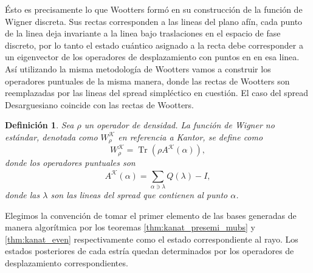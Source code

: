 \documentclass[a4paper]{report}
\DeclareMathOperator{\Tr}{Tr}
\newtheorem{definition}{Definición}
\begin{document}
  Ésto es precisamente lo que Wootters formó en su
  construcción de la función de Wigner discreta. Sus rectas
  corresponden a las lineas del plano afín, cada punto de la
  linea deja invariante a la linea bajo traslaciones en el
  espacio de fase discreto, por lo tanto el estado cuántico
  asignado a la recta debe corresponder a un eigenvector de
  los operadores de desplazamiento con puntos en en esa
  linea. Así utilizando la misma metodología de
  Wootters vamos a construir los operadores puntuales de la
  misma manera, donde las rectas de Wootters son
  reemplazadas por las lineas del spread simpléctico en
  cuestión. El caso del spread Desarguesiano coincide con
  las rectas de Wootters.
  \begin{definition}
    Sea $\rho$ un operador de densidad. La función de Wigner
    no estándar, denotada como $W_\rho^{\mathcal K}$ en
    referencia a Kantor, se define como
    \begin{equation}
      W_\rho^{\mathcal K}
      = \Tr\left( \rho A^{\mathcal K}(\alpha) \right),
    \end{equation}
    donde los operadores puntuales son
    \begin{equation}
      A^{\mathcal K}(\alpha)
      = \sum_{\alpha \ni \lambda}^{} Q(\lambda) - I,
    \end{equation}
    donde las $\lambda$ son las lineas del spread que
    contienen al punto $\alpha$.
  \end{definition}
  Elegimos la convención de tomar el primer elemento de las
  bases generadas de manera algorítmica por los teoremas
  \ref{thm:kanat_presemi_mubs} y \ref{thm:kanat_even}
  respectivamente como el estado correspondiente al rayo.
  Los estados posteriores de cada estría quedan determinados
  por los operadores de desplazamiento correspondientes.
\end{document}

